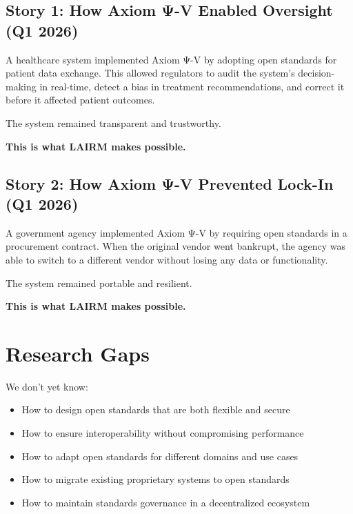 \subsection{Story 1: How Axiom Ψ-V Enabled Oversight (Q1 2026)}

A healthcare system implemented Axiom Ψ-V by adopting open standards for patient data exchange. This allowed regulators to audit the system's decision-making in real-time, detect a bias in treatment recommendations, and correct it before it affected patient outcomes.

The system remained transparent and trustworthy.

\textbf{This is what LAIRM makes possible.}

\subsection{Story 2: How Axiom Ψ-V Prevented Lock-In (Q1 2026)}

A government agency implemented Axiom Ψ-V by requiring open standards in a procurement contract. When the original vendor went bankrupt, the agency was able to switch to a different vendor without losing any data or functionality.

The system remained portable and resilient.

\textbf{This is what LAIRM makes possible.}

\vspace{0.5cm}

\section{Research Gaps}

We don't yet know:

\begin{itemize}
    \item How to design open standards that are both flexible and secure
    
    \item How to ensure interoperability without compromising performance
    
    \item How to adapt open standards for different domains and use cases
    
    \item How to migrate existing proprietary systems to open standards
    
    \item How to maintain standards governance in a decentralized ecosystem
\end{itemize}

